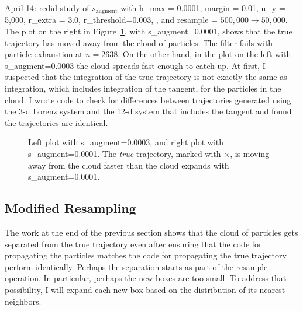 \documentclass[12pt]{article}
\begin{document}
April 14: redid study of $s_{\text{augment}}$ with h\_max = 0.0001,
margin = 0.01, n\_y = 5,000, r\_extra = 3.0, r\_threshold=0.003, , and
resample = $500,000 \rightarrow 50,000$.\\


The plot on the right in Figure~\ref{fig:clouds10X}, with
s\_augment=0.0001, shows that the true trajectory has moved away from
the cloud of particles.  The filter fails with particle exhaustion at
$n=2638$.  On the other hand, in the plot on the left with
s\_augment=0.0003 the cloud spreads fast enough to catch up.  At
first, I suspected that the integration of the true trajectory is not
exactly the same as integration, which includes integration of the
tangent, for the particles in the cloud.  I wrote code to check for
differences between trajectories generated using the 3-d Lorenz system
and the 12-d system that includes the tangent and found the
trajectories are identical.

\begin{figure}
  \centering
  \caption{Left plot with s\_augment=0.0003, and right plot with
    s\_augment=0.0001.  The \emph{true} trajectory, marked with
    $\times$, is moving away from the cloud faster than the cloud
    expands with s\_augment=0.0001.}
  \label{fig:clouds10X}
\end{figure}

\subsection{Modified Resampling}
\label{sec:resample}

The work at the end of the previous section shows that the cloud of
particles gets separated from the true trajectory even after ensuring
that the code for propagating the particles matches the code for
propagating the true trajectory perform identically.  Perhaps the
separation starts as part of the resample operation.  In particular,
perhaps the new boxes are too small.  To address that possibility, I
will expand each new box based on the distribution of its nearest
neighbors.
\end{document}
